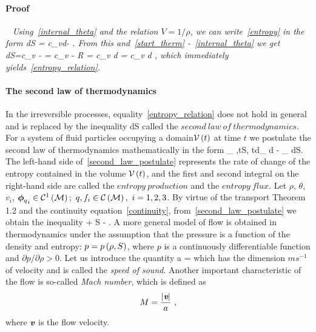 \paragraph{Proof}
\ \newline
\itshape
Using~\eqref{internal_theta} and the relation $V = 1/\rho$, we can write~\eqref{entropy} in the form
\be
\theta dS = c_vd\theta - .
\ee
From this and~\eqref{start_therm} -~\eqref{internal_theta} we get
\be
dS=c_v -  = c_v - R = c_v d \ln{} = c_v d \ln{},
\ee
which immediately yields~\eqref{entropy_relation}.
\upshape
\paragraph{The second law of thermodynamics}
In the irreversible processes, equality~\eqref{entropy_relation} does not hold in general and is replaced by the inequality
\be
\label{entropy_inequality}
dS \geq {}
\ee
called the $second\ law\ of\ thermodynamics$. For a system of fluid particles occupying a domain$\mathcal{V}\left({t}\right)$ at time $t$ we postulate the second law of thermodynamics mathematically in the form
\be
\label{second_law_postulate}
\int_{\ro} \rho\lo{},t\ro S\lo{}, t\ro d\geq \int_{\ro} d - \int_{\delta{}\ro} dS.
\ee
The left-hand side of~\eqref{second_law_postulate} represents the rate of change of the entropy contained in the volume $\mathcal{V}\left({t}\right)$, and the first and second integral on the right-hand side are called the $entropy\ production$ and the $entropy\ flux$. Let $\rho$, $\theta$, $v_i$, ${\boldsymbol{\phi}_q}_i\in\mathcal{C}^1\left(\mathcal{M}\right);\  q, f_i \in \mathcal{C}\left(\mathcal{M}\right),\ i = 1,2,3$. By virtue of the transport Theorem 1.2 and the continuity equation~\eqref{continuity}, from~\eqref{second_law_postulate} we obtain the inequality
\be
\rho{} + \lo\rho S\ro \geq {} - \lo{}\ro.
\ee
A more general model of flow is obtained in thermodynamics under the assumption that the pressure is a function of the density and entropy: $p = p\left(\rho, S\right)$, where $p$ is a continuously differentiable function and $\partial p / \partial\rho >0$. Let us introduce the quantity
\be
a = 
\ee
which has the dimension $m s^{-1}$ of velocity and is called the \emph{speed of sound}. Another important characteristic of the flow is so-called \textit{Mach number}, which is defined as
\begin{equation}
M=\frac{{|\bs{v}|}}{{a}}\ ,
\end{equation}
where $\textit{\textbf{v}}$ is the flow velocity.
